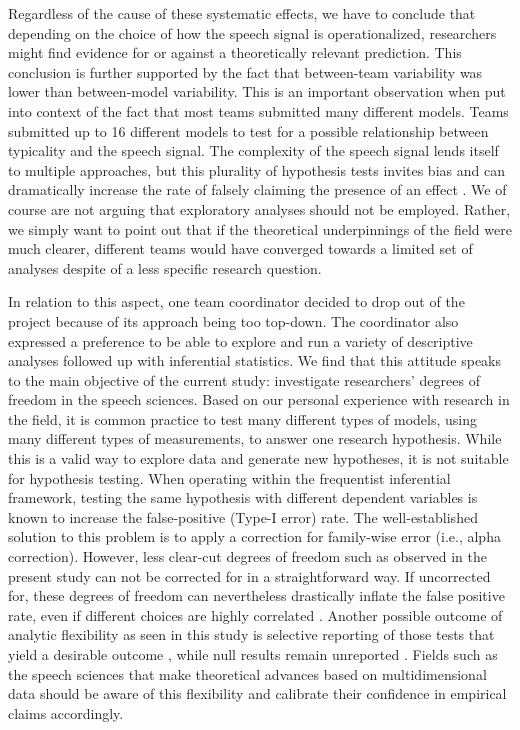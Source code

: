\documentclass[Review,times,sageh]{sagej}
\begin{document}
Regardless of the cause of these systematic effects, we have to conclude that depending on the choice of how the speech signal is operationalized, researchers might find evidence for or against a theoretically relevant prediction.
This conclusion is further supported by the fact that between-team variability was lower than between-model variability.
This is an important observation when put into context of the fact that most teams submitted many different models.
Teams submitted up to 16 different models to test for a possible relationship between typicality and the speech signal.
The complexity of the speech signal lends itself to multiple approaches, but this plurality of hypothesis tests invites bias and can dramatically increase the rate of falsely claiming the presence of an effect \citep{roettger2019researcher, simmons2011false}.
We of course are not arguing that exploratory analyses should not be employed.
Rather, we simply want to point out that if the theoretical underpinnings of the field were much clearer, different teams would have converged towards a limited set of analyses despite of a less specific research question.

In relation to this aspect, one team coordinator decided to drop out of the project because of its approach being too top-down.
The coordinator also expressed a preference to be able to explore and run a variety of descriptive analyses followed up with inferential statistics.
We find that this attitude speaks to the main objective of the current study: investigate researchers' degrees of freedom in the speech sciences.
Based on our personal experience with research in the field, it is common practice to test many different types of models, using many different types of measurements, to answer one research hypothesis.
While this is a valid way to explore data and generate new hypotheses, it is not suitable for hypothesis testing.
When operating within the frequentist inferential framework, testing the same hypothesis with different dependent variables is known to increase the false-positive (Type-I error) rate.
The well-established solution to this problem is to apply a correction for family-wise error (i.e., alpha correction).
However, less clear-cut degrees of freedom such as observed in the present study can not be corrected for in a straightforward way.
If uncorrected for, these degrees of freedom can nevertheless drastically inflate the false positive rate, even if different choices are highly correlated \citep{roettger2019researcher}.
Another possible outcome of analytic flexibility as seen in this study is selective reporting of those tests that yield a desirable outcome \citep{kerr1998harking, john2012measuring, simmons2011false}, while null results remain unreported \citep{sterling1959publication, rosenthal1979file}.
Fields such as the speech sciences that make theoretical advances based on multidimensional data should be aware of this flexibility and calibrate their confidence in empirical claims accordingly.
\end{document}
